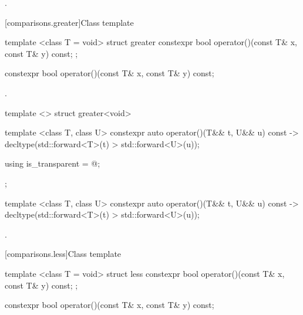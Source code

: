 \begin{itemdescr}
\pnum\returns {}.
\end{itemdescr}

[comparisons.greater]{Class template }

%
\begin{itemdecl}
template <class T = void> struct greater {
  constexpr bool operator()(const T& x, const T& y) const;
};
\end{itemdecl}

%
\begin{itemdecl}
constexpr bool operator()(const T& x, const T& y) const;
\end{itemdecl}

\begin{itemdescr}
\pnum\returns {}.
\end{itemdescr}

%
\begin{itemdecl}
template <> struct greater<void> {
  template <class T, class U> constexpr auto operator()(T&& t, U&& u) const
    -> decltype(std::forward<T>(t) > std::forward<U>(u));

  using is_transparent = @\unspec@;
};
\end{itemdecl}

%
\begin{itemdecl}
template <class T, class U> constexpr auto operator()(T&& t, U&& u) const
    -> decltype(std::forward<T>(t) > std::forward<U>(u));
\end{itemdecl}

\begin{itemdescr}
\pnum\returns {}.
\end{itemdescr}

[comparisons.less]{Class template }

%
\begin{itemdecl}
template <class T = void> struct less {
  constexpr bool operator()(const T& x, const T& y) const;
};
\end{itemdecl}

%
\begin{itemdecl}
constexpr bool operator()(const T& x, const T& y) const;
\end{itemdecl}

